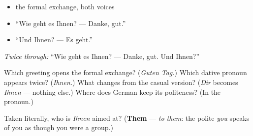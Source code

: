 \begin{itemize}
\raggedright
  \item the formal exchange, both voices
  \item \textquotedblleft{}Wie geht es Ihnen? — Danke, gut.\textquotedblright{}
  \item \textquotedblleft{}Und Ihnen? — Es geht.\textquotedblright{}
\end{itemize}

\emph{Twice through:} \textquotedblleft{}Wie geht es Ihnen? — Danke, gut. Und Ihnen?\textquotedblright{}

\begin{tcolorbox}[breakable,colback=teal!4,colframe=teal!35!black,title={Before you move on}]
Which greeting opens the formal exchange? (\emph{Guten Tag.}) Which dative pronoun appears twice? (\emph{Ihnen.}) What changes from the casual version? (\emph{Dir} becomes \emph{Ihnen} — nothing else.) Where does German keep its politeness? (In the pronoun.)

Taken literally, who is \emph{Ihnen} aimed at? (\textbf{Them} — \emph{to them}: the polite \emph{you} speaks of you as though you were a group.)
\end{tcolorbox}
